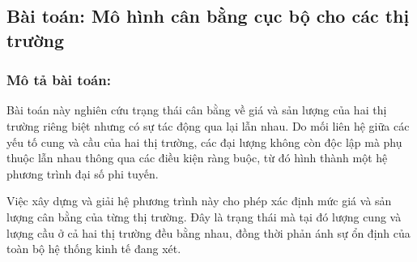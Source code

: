 \documentclass[12pt,a4paper,oneside]{book}
\theoremstyle{theorem}
\theoremstyle{definition}
\begin{document}
\subsection{Bài toán: Mô hình cân bằng cục bộ cho các thị trường}
\subsubsection{Mô tả bài toán:}
Bài toán này nghiên cứu trạng thái cân bằng về giá và sản lượng của hai thị
trường riêng biệt nhưng có sự tác động qua lại lẫn nhau. Do mối liên hệ giữa
các yếu tố cung và cầu của hai thị trường, các đại lượng không còn độc lập mà
phụ thuộc lẫn nhau thông qua các điều kiện ràng buộc, từ đó hình thành một hệ
phương trình đại số phi tuyến.

Việc xây dựng và giải hệ phương trình này cho phép xác định mức giá và sản
lượng cân bằng của từng thị trường. Đây là trạng thái mà tại đó lượng cung và
lượng cầu ở cả hai thị trường đều bằng nhau, đồng thời phản ánh sự ổn định của
toàn bộ hệ thống kinh tế đang xét.
\end{document}
